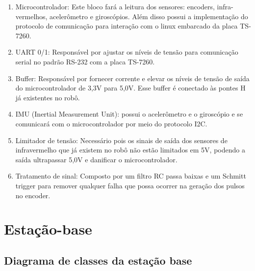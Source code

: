 \begin{enumerate}[topsep=0pt, partopsep=0pt, itemsep=0pt]
    \item Microcontrolador: Este bloco fará a leitura dos sensores: encoders, infra-vermelhos, acelerômetro e giroscópios. Além disso possui a implementação do protocolo de comunicação para interação com o linux embarcado da placa TS-7260.
    \item UART 0/1: Responsável por ajustar os níveis de tensão para comunicação serial no padrão RS-232 com a placa TS-7260.
    \item Buffer: Responsável por fornecer corrente e elevar os níveis de tensão de saída do microcontrolador de 3,3V para 5,0V. Esse buffer é conectado às pontes H já existentes no robô.
    \item IMU (Inertial Measurement Unit): possui o acelerômetro e o giroscópio e se comunicará com o microcontrolador por meio do protocolo I2C.
    \item Limitador de tensão: Necessário pois os sinais de saída dos sensores de infravermelho que já existem no robô não estão limitados em 5V, podendo a saída ultrapassar 5,0V e danificar o microcontrolador. 
    \item Tratamento de sinal: Composto por um filtro RC passa baixas e um Schmitt trigger para remover qualquer falha que possa ocorrer na geração dos pulsos no encoder.
\end{enumerate}

\section{Estação-base}
\subsection{Diagrama de classes da estação base}

